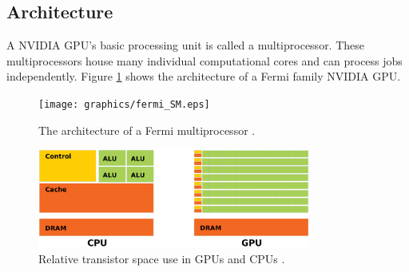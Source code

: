 \subsection{Architecture}

A NVIDIA GPU's basic processing unit is called a multiprocessor.  These multiprocessors house many individual computational cores and can process jobs independently.  Figure \ref{fermi_SM} shows the architecture of a Fermi family NVIDIA GPU.  

\begin{figure}[h!] 
  \centering
    \texttt{[image: graphics/fermi\_SM.eps]}
     \caption[The architecture of a Fermi multiprocessor.]{The architecture of a Fermi multiprocessor \cite{cuda}. \label{fermi_SM}}
\end{figure}


\begin{figure}[h!] 
  \centering
    \includegraphics[width=0.8\textwidth]{graphics/CUDA_transistors.eps}
     \caption[Relative transistor space use in GPUs and CPUs.]{Relative transistor space use in GPUs and CPUs \cite{cuda}. \label{cuda_transistors}}
\end{figure}

